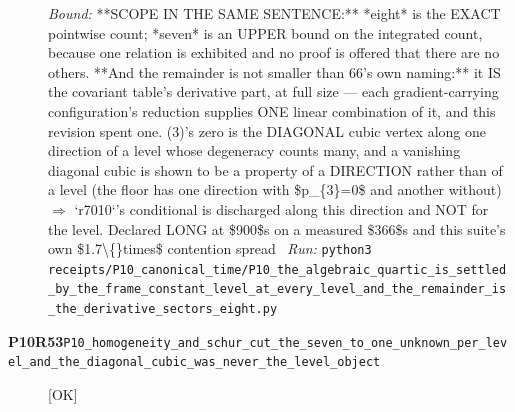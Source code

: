 \begin{description}
 \emph{Bound:}  **SCOPE IN THE SAME SENTENCE:** *eight* is the EXACT pointwise count; *seven* is an UPPER bound on the integrated count, because one relation is exhibited and no proof is offered that there are no others.  **And the remainder is not smaller than 66's own naming:** it IS the covariant table's derivative part, at full size --- each gradient-carrying configuration's reduction supplies ONE linear combination of it, and this revision spent one.  (3)'s zero is the DIAGONAL cubic vertex along one direction of a level whose degeneracy counts many, and a vanishing diagonal cubic is shown to be a property of a DIRECTION rather than of a level (the floor has one direction with \$p\_\{3\}=0\$ and another without) \ensuremath{\Rightarrow} `r7010`'s conditional is discharged along this direction and NOT for the level.  Declared LONG at \$900\$s on a measured \$366\$s and this suite's own \$1.7\textbackslash\{\}times\$ contention spread
\ \emph{Run:} \texttt{python3 receipts/P10\_canonical\_time/P10\_the\_algebraic\_quartic\_is\_settled\_by\_the\_frame\_constant\_level\_at\_every\_level\_and\_the\_remainder\_is\_the\_derivative\_sectors\_eight.py}
\item[\rcptlabel{P10_homogeneity_and_schur_cut_the_seven_to_one_unknown_per_level_and_the_diagonal_cubic_was_never_the_level_object}{P10R53}\textbf{P10R53}\quad\texttt{P10\_homogeneity\_and\_schur\_cut\_the\_seven\_to\_one\_unknown\_per\_level\_and\_the\_diagonal\_cubic\_was\_never\_the\_level\_object}]\hfill\textsf{[OK]}\\

\end{description}

